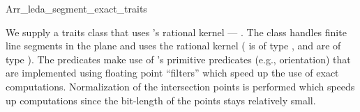 
\ccRefPageBegin



\begin{ccRefClass}{Arr_leda_segment_exact_traits}


\ccDefinition
    We supply a traits class that uses \leda\/'s rational kernel ---
    \ccRefName.\/ The class handles
    finite line segments in the plane
    and uses the \leda\/ rational kernel ( is of type 
    ,  and  are of type
    ). The predicates make use of \leda\/'s primitive
    predicates (e.g., orientation) that are implemented using floating point
    ``filters'' \cite{fv-sayee-96} which speed up the use of exact 
    computations.
    Normalization of the intersection points is performed which speeds up
    computations since the bit-length of the points stays relatively small.


\ccIsModel
     


\end{ccRefClass} 


\ccRefPageEnd

